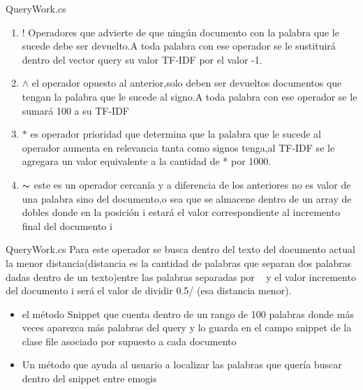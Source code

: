   \begin{frame}[fragile]{QueryWork.cs}
      \begin{enumerate}
          \item ! Operadores que  advierte de  que ningún documento con la palabra que le sucede
          debe ser devuelto.A toda palabra con ese operador se le sustituirá dentro del
          vector query su valor TF-IDF por el valor -1.
          \item $\wedge$ el operador opuesto al anterior,solo deben ser devueltos documentos que
          tengan la palabra que le sucede al signo.A toda palabra con ese operador se le
          sumar\'a 100 a su TF-IDF
          \item  $\ast$  es operador prioridad que determina que la palabra que le sucede al operador
          aumenta en relevancia tanta como signos tenga,al TF-IDF se le agregara un
          valor equivalente a la cantidad de * por 1000.
          \item $\thicksim$ este es un operador cercanía y a diferencia de  los anteriores no es valor de
          una palabra sino del documento,o sea que se almacene dentro de un array de
          dobles donde en la posición i estará el valor correspondiente al incremento final
          del documento i
          
      \end{enumerate}
    \end{frame}
    \begin{frame}[fragile]{QueryWork.cs}
      Para este operador se  busca dentro del texto del documento actual la menor
      distancia(distancia es la cantidad de palabras que separan dos palabras dadas
      dentro de un texto)entre las palabras separadas por ~ y  el valor incremento del
      documento i será el valor de dividir 0.5/ (esa distancia menor).
      \begin{itemize}
        
      \item el  método  Snippet que cuenta dentro de un rango de 100 palabras donde más
      veces aparezca  más palabras del query  y lo guarda en el campo snippet de la
      clase file asociado por supuesto a cada documento 
      \item Un método que ayuda al usuario a localizar las palabras que  quería buscar
      dentro del snippet entre emogis 
      \end{itemize}
    \end{frame}

